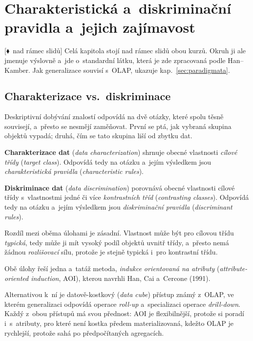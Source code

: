 \documentclass[11pt,a4paper]{article}
\theoremstyle{definition}
\newcommand{\mimo}{\textcolor{markcol}{\textsf{\footnotesize[$\blacklozenge$~nad rámec slidů]}}}
\begin{document}
\newpage

\section{Charakteristická a~diskriminační pravidla a~jejich zajímavost}
\label{sec:pravidla}

\mimo{} Celá kapitola stojí nad rámec slidů obou kurzů. Okruh ji ale jmenuje výslovně a~jde
o~standardní látku, která je zde zpracovaná podle Han--Kamber. Jak generalizace souvisí
s~OLAP, ukazuje kap.~\ref{sec:paradigmata}.

\subsection{Charakterizace vs.\ diskriminace}

Deskriptivní dobývání znalostí odpovídá na dvě otázky, které spolu těsně souvisejí, a~přesto
se nesmějí zaměňovat. První se ptá, jak vybraná skupina objektů vypadá; druhá, čím se tato
skupina liší od zbytku dat.

\begin{defbox}
\textbf{Charakterizace dat} (\emph{data characterization}) shrnuje obecné vlastnosti
\emph{cílové třídy} (\emph{target class}). Odpovídá tedy na otázku  a~jejím výsledkem jsou \emph{charakteristická pravidla}
(\emph{characteristic rules}).

\textbf{Diskriminace dat} (\emph{data discrimination}) porovnává obecné vlastnosti cílové
třídy s~vlastnostmi jedné či více \emph{kontrastních tříd} (\emph{contrasting classes}).
Odpovídá tedy na otázku  a~jejím
výsledkem jsou \emph{diskriminační pravidla} (\emph{discriminant rules}).

Rozdíl mezi oběma úlohami je zásadní. Vlastnost může být pro cílovou třídu \emph{typická},
tedy může ji mít vysoký podíl objektů uvnitř třídy, a~přesto nemá žádnou \emph{rozlišovací}
sílu, protože je stejně typická i~pro kontrastní třídu.
\end{defbox}

Obě úlohy řeší jedna a~tatáž metoda, \emph{indukce orientovaná na atributy}
(\emph{attribute-oriented induction}, AOI), kterou navrhli Han, Cai a~Cercone (1991).

Alternativou k~ní je datově-kostkový (\emph{data cube}) přístup známý z~OLAP, ve kterém
generalizaci odpovídá operace \emph{roll-up} a~specializaci operace \emph{drill-down}. Každý
z~obou přístupů má svou přednost: AOI je flexibilnější, protože si poradí i~s~atributy, pro
které není kostka předem materializovaná, kdežto OLAP je rychlejší, protože sahá po
předpočítaných agregacích.
\end{document}
